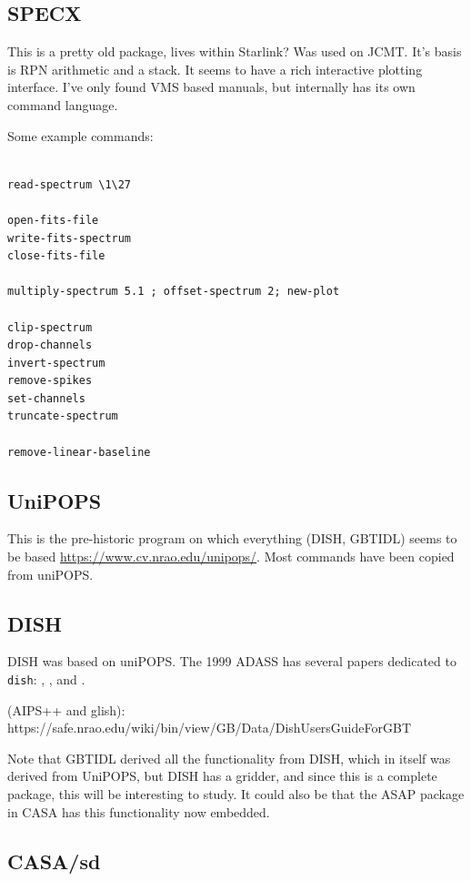 \documentclass[12pt,a4paper]{article}
\begin{document}
\subsection{SPECX}

This is a pretty old package, lives within Starlink? Was used on JCMT. It's
basis is  RPN arithmetic and a stack. It seems to have a rich interactive
plotting interface. I've only found VMS based manuals,
but internally has its own command language.

Some example commands:
\footnotesize\begin{verbatim}

read-spectrum \1\27

open-fits-file
write-fits-spectrum
close-fits-file

multiply-spectrum 5.1 ; offset-spectrum 2; new-plot

clip-spectrum
drop-channels
invert-spectrum
remove-spikes
set-channels
truncate-spectrum

remove-linear-baseline

\end{verbatim}
\normalsize

\subsection{UniPOPS}

This is the pre-historic program on which everything (DISH, GBTIDL) seems to be based
\url{https://www.cv.nrao.edu/unipops/}. Most commands have been copied from uniPOPS.


\subsection{DISH}
DISH was based on uniPOPS. The 1999 ADASS has several papers dedicated to {\tt dish}:
\cite{2000ASPC..216..498G},
\cite{2000ASPC..216..494G}, and 
\cite{2000ASPC..216..243G}.

(AIPS++ and glish):  https://safe.nrao.edu/wiki/bin/view/GB/Data/DishUsersGuideForGBT

Note that GBTIDL derived all the functionality from DISH, which in itself was derived from UniPOPS,
but DISH has a gridder, and since this is a complete package, this will be interesting to study.
It could also be that the ASAP package in CASA has this functionality now embedded.


\subsection{CASA/sd}
\end{document}
